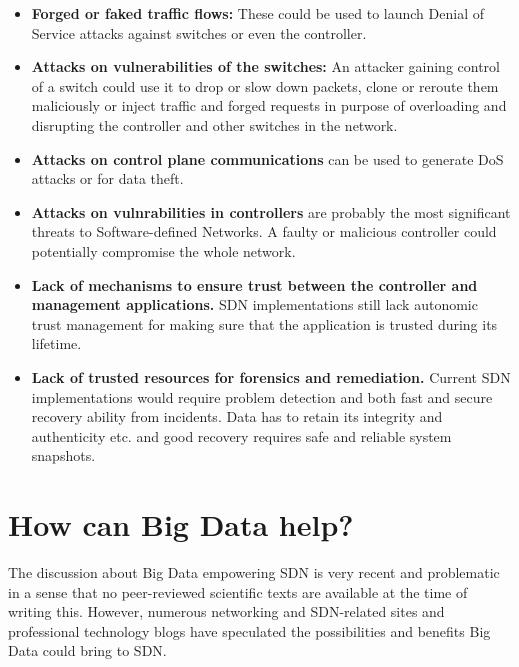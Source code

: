 \documentclass{acm_proc_article-sp}
\begin{document}
\begin{itemize}
\item \textbf{Forged or faked traffic flows:} These could be used to launch Denial of Service attacks against switches or even the controller.
\item \textbf{Attacks on vulnerabilities of the switches:} An attacker gaining control of a switch could use it to drop or slow down packets, clone or reroute them maliciously or inject traffic and forged requests in purpose of overloading and disrupting the controller and other switches in the network.
\item \textbf{Attacks on control plane communications} can be used to generate DoS attacks or for data theft.
\item \textbf{Attacks on vulnrabilities in controllers} are probably the most significant threats to Software-defined Networks. A faulty or malicious controller could potentially compromise the whole network.
\item \textbf{Lack of mechanisms to ensure trust between the controller and management applications.} SDN implementations still lack autonomic trust management for making sure that the application is trusted during its lifetime.
\item \textbf{Lack of trusted resources for forensics and remediation.} Current SDN implementations would require problem detection and both fast and secure recovery ability from incidents. Data has to retain its integrity and authenticity etc. and good recovery requires safe and reliable system snapshots.
\end{itemize}

\section{How can Big Data help?}

The discussion about Big Data empowering SDN is very recent and problematic in a sense that no peer-reviewed scientific texts are available at the time of writing this. However, numerous networking and SDN-related sites and professional technology blogs have speculated the possibilities and benefits Big Data could bring to SDN.
\end{document}

